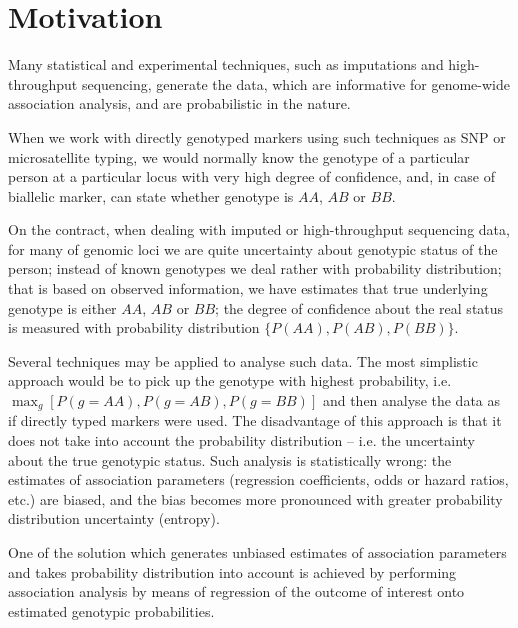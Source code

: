 \documentclass[12pt,a4paper]{article}
\begin{document}
\maketitle
\tableofcontents


\section{Motivation}

Many statistical and experimental techniques, such as imputations and 
high-throughput sequencing, generate the data, which are informative for 
genome-wide association analysis, and are probabilistic in the nature. 

When we work with directly genotyped markers using such techniques as 
SNP or microsatellite typing, we would normally know the genotype of 
a particular person at a particular locus with very high degree of 
confidence, and, in case of biallelic marker, can state whether 
genotype is $AA$, $AB$ or $BB$. 

On the contract, when dealing with imputed or 
high-throughput sequencing data, for many of genomic loci 
we are quite uncertainty about genotypic status of the person; 
instead of known genotypes  
we deal rather with probability distribution; that is based on 
observed information, we have estimates that true underlying 
genotype is either $AA$, $AB$ or $BB$; the degree of confidence 
about the real status is measured with 
probability distribution $\{P(AA), P(AB), P(BB)\}$.

Several techniques may be applied to analyse such data. The most 
simplistic approach would be to pick up the genotype with highest 
probability, i.e. $\max_g[P(g=AA), P(g=AB), P(g=BB)]$ and then 
analyse the data as if directly typed markers were used. The 
disadvantage of this approach is that it does not take into 
account the probability distribution -- i.e. the uncertainty 
about the true genotypic status. Such 
analysis is statistically wrong: the estimates of association 
parameters (regression coefficients, odds or hazard ratios, etc.) 
are biased, and the bias becomes more pronounced with greater 
probability distribution uncertainty (entropy). 

One of the solution which generates unbiased estimates 
of association parameters and takes 
probability distribution into account is achieved by 
performing association analysis by means of regression of the 
outcome of interest onto estimated genotypic probabilities. 
\end{document}
